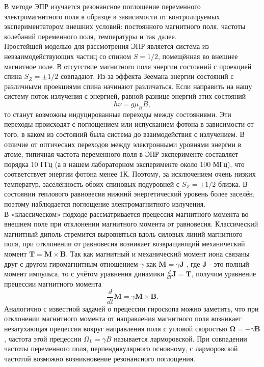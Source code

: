 \documentclass[a4paper, 12pt]{article}
\begin{document}
В методе ЭПР изучается резонансное поглощение переменного электромагнитного поля в образце в зависимости от контролируемых экспериментатором внешних условий: постоянного магнитного поля, частоты колебаний переменного поля, температуры и так далее. \\
Простейшей моделью для рассмотрения ЭПР является система из невзаимодействующих
частиц со спином $S = 1/2$, помещённая во внешнее магнитное поле. В отсутствие
магнитного поля энергии состояний с проекцией спина $S_Z = \pm 1/2$ совпадают. Из-за эффекта Зеемана энергии состояний с различными проекциями спина начинают различаться. Если направить на нашу систему поток излучения с энергией, равной разнице энергий этих состояний 
\begin{equation}\label{2}
h \nu = g\mu_B B,
\end{equation} 
то станут возможны индуцированные переходы между состояниями. Эти переходы происходят с поглощением или испусканием фотона в зависимости от того, в каком из состояний была система до взаимодействия с излучением. В отличие от оптических переходов между электронными уровнями энергии в атоме, типичная частота переменного поля в ЭПР эксперименте составляет порядка 10 ГГц (а в нашем лабораторном эксперименте около 100 МГц), что соответствует энергии фотона менее 1К. Поэтому, за исключением очень низких температур, заселённость обоих спиновых подуровней с $S_Z = \pm 1/2$ близка. В состоянии теплового равновесия нижний энергетический уровень более заселён, поэтому наблюдается поглощение электромагнитного излучения. \\
В «классическом» подходе рассматривается прецессия магнитного момента во внешнем поле при отклонении магнитного момента от равновесия. Классический магнитный диполь стремится выровняться вдоль силовых линий магнитного поля, при отклонении от равновесия возникает возвращающий механический момент $\mathbf{T} = \mathbf{M}\times \mathbf{B}$. Так как магнитный и механический момент иона связаны друг с другом гиромагнитным отношением $\gamma$ как $\mathbf{M}=\gamma \mathbf{J}$ , где $\mathbf{J}$ - это полный момент импульса, то с учётом уравнения динамики
$\frac{d}{dt}\mathbf{J} = \mathbf{T}$, получим уравнение прецессии магнитного момента
\[\dfrac{d}{dt}\mathbf{M} = \gamma \mathbf{M} \times \mathbf{B}.\] 
Аналогично
с известной задачей о прецессии гироскопа можно заметить, что при отклонении магнитного момента от направления магнитного поля возникает незатухающая прецессия вокруг направления поля с угловой скоростью $\boldsymbol{\Omega} = -\gamma \mathbf{B}$, частота этой прецессии $\Omega_L = \gamma B$ называется ларморовской. При совпадении частоты переменного поля, перпендикулярного основному, с ларморовской частотой возможно возникновение резонансного поглощения.
\end{document}
